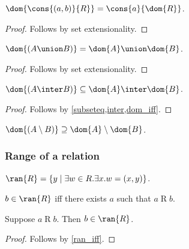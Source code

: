 \begin{proposition}\label{dom_cons}
    $\dom{\cons{(a,b)}{R}} = \cons{a}{\dom{R}}$.
\end{proposition}
\begin{proof}
    Follows by set extensionality.
\end{proof}

\begin{proposition}\label{dom_union}
    $\dom{(A\union B)} = \dom{A}\union\dom{B}$.
\end{proposition}
\begin{proof}
    Follows by set extensionality.
\end{proof}

\begin{proposition}\label{dom_inter}
    $\dom{(A\inter B)}\subseteq \dom{A}\inter\dom{B}$.
\end{proposition}
\begin{proof}
    Follows by \cref{subseteq,inter,dom_iff}.
\end{proof}

\begin{proposition}\label{dom_setminus}
    $\dom{(A\setminus B)}\supseteq \dom{A}\setminus\dom{B}$.
\end{proposition}


\subsubsection{Range of a relation}

\begin{definition}\label{ran}
    $\ran{R} = \{ y\mid \exists w\in R. \exists x. w = (x, y)\}$.
\end{definition}

\begin{proposition}\label{ran_iff}
    $b\in\ran{R}$ iff there exists $a$ such that $a\mathrel{R} b$.
\end{proposition}

\begin{proposition}\label{ran_intro}
    Suppose $a\mathrel{R} b$.
    Then $b\in\ran{R}$.
\end{proposition}
\begin{proof}
    Follows by \cref{ran_iff}.
\end{proof}

